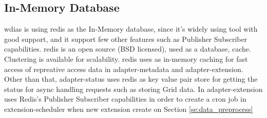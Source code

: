 \subsection{In-Memory Database}
\label{subse:redis}
\acrshort{wdias} is using \acrshort{redis} \cite{redisRedisDocumentation} as the In-Memory database, since it's widely using tool with good support, and it support few other features such as Publisher Subscriber capabilities.
\acrshort{redis} is an open source (BSD licensed), used as a database, cache. Clustering is available for scalability.
\acrshort{redis} uses as in-memory caching for fast access of repreative access data in adapter-metadata and adapter-extension.
Other than that, adapter-status uses \acrshort{redis} as key value pair store for getting the status for async handling requests such as storing Grid data.
In adapter-extension uses Redis's Publisher Subscriber capabilities in order to create a cron job in extension-scheduler when new extension create on Section \ref{se:data_preprocess}
